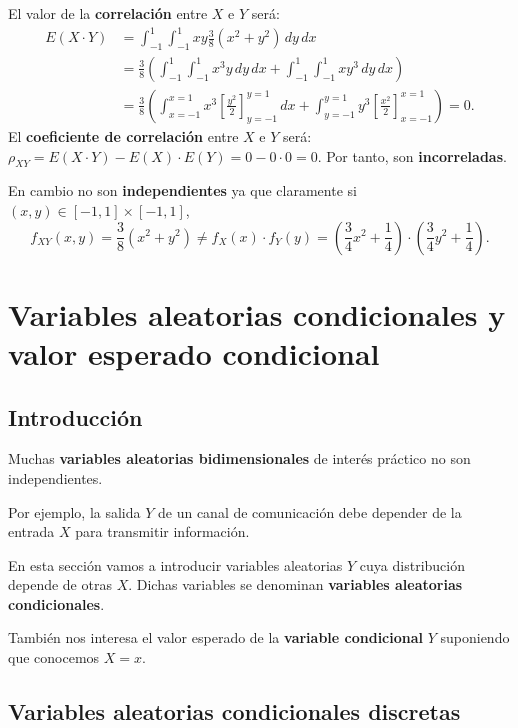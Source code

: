 \documentclass[]{book}
\begin{document}
El valor de la \textbf{correlación} entre \(X\) e \(Y\) será:
\[
\begin{array}{rl}
E(X\cdot Y) & =\int_{-1}^1\int_{-1}^1 x y \frac{3}{8}(x^2+y^2)\, dy\, dx\\ & =\frac{3}{8}\left(\int_{-1}^1\int_{-1}^1 x^3 y\, dy \, dx+\int_{-1}^1\int_{-1}^1 x y^3\, dy \, dx\right) \\ & = \frac{3}{8} \left(\int_{x=-1}^{x=1}x^3 \left[\frac{y^2}{2}\right]_{y=-1}^{y=1}\, dx + \int_{y=-1}^{y=1}y^3 \left[\frac{x^2}{2}\right]_{x=-1}^{x=1}\right)=0.
\end{array}
\]
El \textbf{coeficiente de correlación} entre \(X\) e \(Y\) será: \(\rho_{XY}=E(X\cdot Y)-E(X)\cdot E(Y)=0-0\cdot 0=0\). Por tanto, son \textbf{incorreladas}.

En cambio no son \textbf{independientes} ya que claramente si \((x,y)\in [-1,1]\times [-1,1]\),
\[
f_{XY}(x,y)=\frac{3}{8}(x^2+y^2) \neq f_X(x)\cdot f_Y(y)=\left(\frac{3}{4} x^2+\frac{1}{4}\right)\cdot \left(\frac{3}{4} y^2+\frac{1}{4}\right).
\]

\hypertarget{variables-aleatorias-condicionales-y-valor-esperado-condicional}{%
\section{Variables aleatorias condicionales y valor esperado condicional}\label{variables-aleatorias-condicionales-y-valor-esperado-condicional}}

\hypertarget{introducciuxf3n-8}{%
\subsection{Introducción}\label{introducciuxf3n-8}}

Muchas \textbf{variables aleatorias bidimensionales} de interés práctico no son independientes.

Por ejemplo, la salida \(Y\) de un canal de comunicación debe depender de la entrada \(X\) para transmitir información.

En esta sección vamos a introducir variables aleatorias \(Y\) cuya distribución depende de otras \(X\). Dichas variables se denominan \textbf{variables aleatorias condicionales}.

También nos interesa el valor esperado de la \textbf{variable condicional} \(Y\) suponiendo que conocemos \(X=x\).

\hypertarget{variables-aleatorias-condicionales-discretas}{%
\subsection{Variables aleatorias condicionales discretas}\label{variables-aleatorias-condicionales-discretas}}
\end{document}
